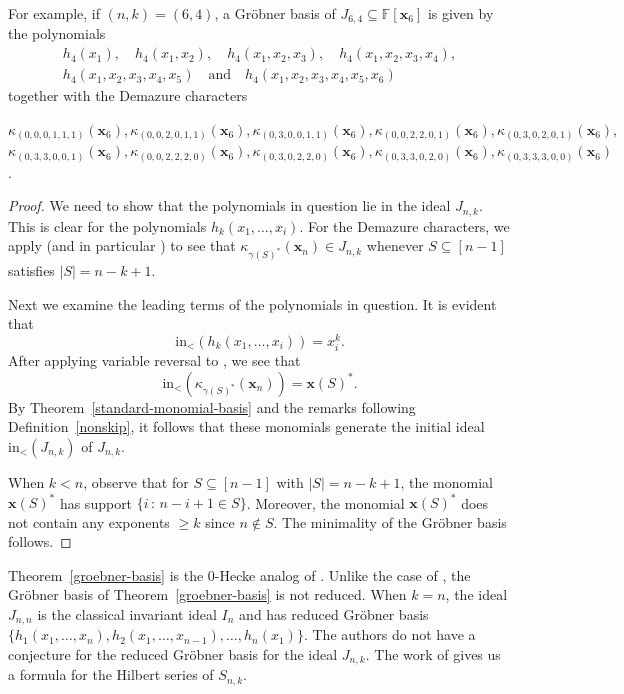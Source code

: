 \documentclass[10pt]{amsart}
\theoremstyle{definition}
\newcommand{\init}{{\mathrm {in}}}
\newcommand{\FF}{{\mathbb{F}}}
\newcommand{\xx}{{\mathbf {x}}}
\begin{document}
For example, if $(n,k) = (6,4)$, a Gr\"obner basis of $J_{6,4} \subseteq \FF[\xx_6]$ is given by the polynomials
\begin{gather*}
h_4(x_1),\quad h_4(x_1, x_2),\quad h_4(x_1, x_2, x_3),\quad h_4(x_1, x_2, x_3, x_4),\\
h_4(x_1, x_2, x_3, x_4, x_5)\quad\text{and}\quad h_4(x_1,x_2,x_3,x_4,x_5,x_6)
\end{gather*}
together with the Demazure characters
\begin{center}
$\kappa_{(0,0,0,1,1,1)}(\xx_6), \kappa_{(0,0,2,0,1,1)}(\xx_6), \kappa_{(0,3,0,0,1,1)}(\xx_6),
\kappa_{(0,0,2,2,0,1)}(\xx_6), \kappa_{(0,3,0,2,0,1)}(\xx_6),$ \\
$\kappa_{(0,3,3,0,0,1)}(\xx_6), \kappa_{(0,0,2,2,2,0)}(\xx_6), \kappa_{(0,3,0,2,2,0)}(\xx_6),
\kappa_{(0,3,3,0,2,0)}(\xx_6), \kappa_{(0,3,3,3,0,0)}(\xx_6)$.
\end{center}



\begin{proof}
We need to show that the polynomials in question lie in the ideal $J_{n,k}$.  This is clear for the polynomials
$h_k(x_1, \dots, x_i)$.  For the Demazure characters, we apply \cite[Lem. 3.4]{HRS} 
(and in particular \cite[Eqn. 3.4]{HRS}) to see that $\kappa_{\gamma(S)^*}(\xx_n) \in J_{n,k}$ whenever 
$S \subseteq [n-1]$ satisfies $|S| = n-k+1$.

Next we examine the leading terms of the polynomials in question.  It is evident that
\begin{equation*}
\init_<(h_k(x_1, \dots, x_i)) = x_i^k.  
\end{equation*}
After applying variable reversal to \cite[Lem. 3.5]{HRS}, we see that
\begin{equation*}
\init_<(\kappa_{\gamma(S)^*}(\xx_n)) = \xx(S)^*.
\end{equation*}
By Theorem~\ref{standard-monomial-basis} and the remarks following Definition~\ref{nonskip}, it follows
that these monomials generate the initial ideal $\init_<(J_{n,k})$ of $J_{n,k}$.

When $k < n$, observe that for $S \subseteq [n-1]$ with $|S| = n-k+1$, the monomial 
$\xx(S)^*$ has support $\{ i \,:\, n-i+1 \in S \}$.  Moreover, the monomial 
$\xx(S)^*$ does not contain any exponents $\geq k$ since $n \notin S$.  
The minimality of the Gr\"obner basis follows.
\end{proof}


Theorem~\ref{groebner-basis} is the 0-Hecke analog of \cite[Thm. 4.14]{HRS}.  
Unlike the case of \cite[Thm. 4.14]{HRS}, the Gr\"obner basis of Theorem~\ref{groebner-basis}
is not reduced.  
When $k = n$, the ideal $J_{n,n}$ is the classical invariant ideal $I_n$ and has 
reduced Gr\"obner basis $\{h_1(x_1, \dots, x_n), h_2(x_1, \dots, x_{n-1}), \dots, h_n(x_1) \}$.
The authors do not have a conjecture for the reduced Gr\"obner basis
for the ideal $J_{n,k}$.
The work of \cite{HRS} gives us a formula for the Hilbert series of $S_{n,k}$.
\end{document}
